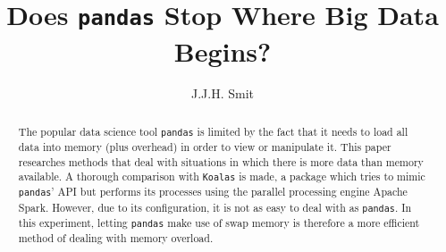\documentclass[sigchi, nonacm]{acmart}
\begin{document}
\title{Does \texttt{pandas} Stop Where Big Data Begins?}

\author{J.J.H. Smit}

\begin{abstract}
    The popular data science tool \texttt{pandas} is limited by the fact that it needs to load all data into memory (plus overhead) in order to view or manipulate it. This paper researches methods that deal with situations in which there is more data than memory available. A thorough comparison with \texttt{Koalas} is made, a package which tries to mimic \texttt{pandas}' API but performs its processes using the parallel processing engine Apache Spark. However, due to its configuration, it is not as easy to deal with as \texttt{pandas}. In this experiment, letting \texttt{pandas} make use of swap memory is therefore a more efficient method of dealing with memory overload.
\end{abstract}


\maketitle

%







\newpage


\end{document}
